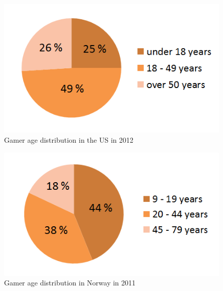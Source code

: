 \begin{figure}
\label{fig:GamersUS}
\begin{center}
\includegraphics[scale=0.7]{gamersus}
\caption[Gamer age distribution, the US, 2012]{Gamer age distribution in the US in 2012 \cite{statistics2012}}
\end{center}
\end{figure}

\begin{figure}
\label{fig:GamersNorway}
\begin{center}
\includegraphics[scale=0.7]{gamersnorway}
\caption[Gamer age distribution, Norway, 2011]{Gamer age distribution in Norway in 2011 \cite{ssb2011}}
\end{center}
\end{figure}
       
